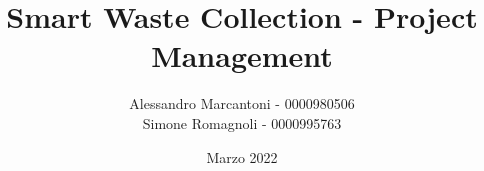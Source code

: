 \title{Smart Waste Collection - Project Management}
\author{Alessandro Marcantoni - 0000980506\\
Simone Romagnoli - 0000995763}
\date{Marzo 2022}